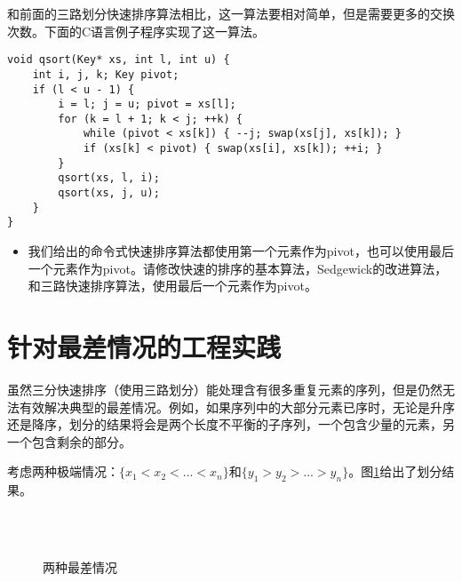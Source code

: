 \documentclass{ctexart}
\begin{document}
和前面的三路划分快速排序算法相比，这一算法要相对简单，但是需要更多的交换次数。下面的C语言例子程序实现了这一算法。

\lstset{language=C}
\begin{lstlisting}
void qsort(Key* xs, int l, int u) {
    int i, j, k; Key pivot;
    if (l < u - 1) {
        i = l; j = u; pivot = xs[l];
        for (k = l + 1; k < j; ++k) {
            while (pivot < xs[k]) { --j; swap(xs[j], xs[k]); }
            if (xs[k] < pivot) { swap(xs[i], xs[k]); ++i; }
        }
        qsort(xs, l, i);
        qsort(xs, j, u);
    }
}
\end{lstlisting}

\begin{Exercise}
\begin{itemize}
\item 我们给出的命令式快速排序算法都使用第一个元素作为pivot，也可以使用最后一个元素作为pivot。请修改快速的排序的基本算法，Sedgewick的改进算法，和三路快速排序算法，使用最后一个元素作为pivot。
\end{itemize}
\end{Exercise}

\section{针对最差情况的工程实践}

虽然三分快速排序（使用三路划分）能处理含有很多重复元素的序列，但是仍然无法有效解决典型的最差情况。例如，如果序列中的大部分元素已序时，无论是升序还是降序，划分的结果将会是两个长度不平衡的子序列，一个包含少量的元素，另一个包含剩余的部分。

考虑两种极端情况：$\{ x_1 < x_2 < ... < x_n\}$和$\{ y_1 > y_2 > ... > y_n\}$。图\ref{fig:worst-cases-1}给出了划分结果。

\begin{figure}[htbp]
   \centering
    \\
    \\
   \caption{两种最差情况}
   \label{fig:worst-cases-1}
\end{figure}
\end{document}
